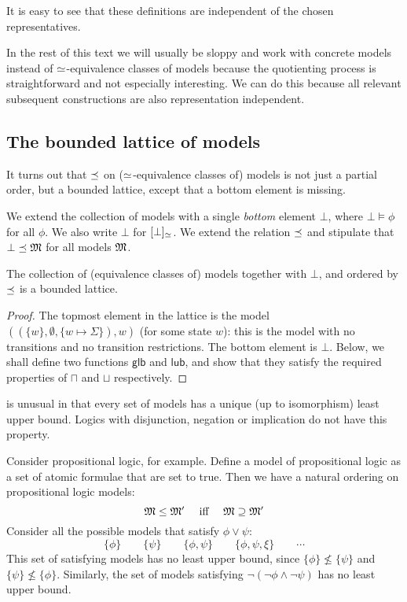 \NI It is easy to see that these definitions are independent of the
chosen representatives.

In the rest of this text we will usually be sloppy and work with
concrete models instead of $\simeq$-equivalence classes of models
because the quotienting process is straightforward and not especially
interesting. We can do this because all relevant subsequent
constructions are also representation independent.  

\subsection{The bounded lattice of models}
\label{boundedlattice}
It turns out that $\preceq $ on ($\simeq$-equivalence classes of)
models is not just a partial order, but a bounded lattice, except
that a bottom element is missing.

\begin{definition}
We extend the collection of models with a single \emph{bottom} element
$\bot$, where $\bot \models \phi$ for all $\phi$. We also write $\bot$
for $[\bot]_{\simeq}$.  We extend the relation $\preceq $ and
stipulate that $\bot \preceq \frak{M}$ for all models $\frak{M}$.
\end{definition}

\begin{theorem}
The collection of (equivalence classes of) models together with
$\bot$, and ordered by $\preceq$ is a bounded lattice.
\end{theorem}
\begin{proof}
The topmost element in the lattice is the model $( (\{w\}, \emptyset,
\{w \mapsto \Sigma\}), w)$ (for some state $w$): this is the model
with no transitions and no transition restrictions.  The bottom
element is $\bot$.  Below, we shall define two functions $\mathsf{glb}$ and $\mathsf{lub}$, and show that they satisfy the required properties of $\sqcap$ and $\sqcup$ respectively.
\end{proof}

\Cathoristic{} is unusual in that every set of models has a unique (up to
isomorphism) least upper bound. Logics with disjunction, negation or implication do
not have this property.  

Consider propositional logic, for example.
Define a model of propositional logic as a set of atomic formulae that are set to true.
Then we have a natural ordering  on propositional logic models:
\[
\frak{M} \leq \frak{M}' \quad\text{ iff }\quad \frak{M} \supseteq \frak{M}'
\]
Consider all the possible models that satisfy $\phi \lor \psi$:
\[
\{\phi\} \qquad
\{\psi\} \qquad
\{\phi, \psi\} \qquad
\{\phi, \psi, \xi\}\qquad
\cdots
\]
This set of satisfying models has no least upper bound, since $\{\phi\} \nleq \{\psi\}$ and $\{\psi\} \nleq \{\phi\}$.
Similarly,  the set of models satisfying $\neg (\neg \phi \land \neg \psi)$ has no least upper bound.

